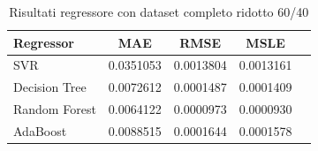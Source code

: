 \begin{table}[H]
    \centering
    \begin{tabular}{|>{\centering\arraybackslash}m{5cm}|c|c|c|c|}
        \hline
        \textbf{Regressor} & \textbf{MAE} & \textbf{RMSE} & \textbf{MSLE} \\ [10pt]
        \hline
        SVR & 0.0351053 & 0.0013804 & 0.0013161 \\ [10pt]
        \hline
        Decision Tree & 0.0072612 & 0.0001487 & 0.0001409 \\ [10pt]
        \hline
        Random Forest & 0.0064122 & 0.0000973 & 0.0000930 \\ [10pt]
        \hline
        AdaBoost & 0.0088515 & 0.0001644 & 0.0001578 \\ [10pt]
        \hline
    \end{tabular}
    \caption{Risultati regressore con dataset completo ridotto 60/40}
    \label{tab:results}
\end{table}


